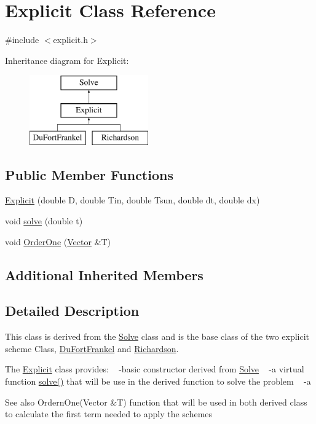 \hypertarget{class_explicit}{}\section{Explicit Class Reference}
\label{class_explicit}


{\ttfamily \#include $<$explicit.\+h$>$}

Inheritance diagram for Explicit\+:\begin{figure}[H]
\begin{center}
\leavevmode
\includegraphics[height=3.000000cm]{class_explicit}
\end{center}
\end{figure}
\subsection*{Public Member Functions}
\begin{DoxyCompactItemize}
\item 
\hyperlink{class_explicit_ab5b890fae2ea8a91c95e9a15f552f36a}{Explicit} (double D, double Tin, double Tsun, double dt, double dx)
\item 
void \hyperlink{class_explicit_ac99aa17bfd95f66b33e5c0ecf0e53785}{solve} (double t)
\item 
void \hyperlink{class_explicit_a6069720017eb2bb0d989b2557c162c97}{Order\+One} (\hyperlink{class_vector}{Vector} \&T)
\end{DoxyCompactItemize}
\subsection*{Additional Inherited Members}


\subsection{Detailed Description}
This class is derived from the \hyperlink{class_solve}{Solve} class and is the base class of the two explicit scheme Class, \hyperlink{class_du_fort_frankel}{Du\+Fort\+Frankel} and \hyperlink{class_richardson}{Richardson}.

The \hyperlink{class_explicit}{Explicit} class provides\+: ~\newline
-\/basic constructor derived from \hyperlink{class_solve}{Solve} ~\newline
-\/a virtual function \hyperlink{class_explicit_ac99aa17bfd95f66b33e5c0ecf0e53785}{solve()} that will be use in the derived function to solve the problem ~\newline
-\/a \begin{DoxySeeAlso}{See also}
Ordern\+One(\+Vector \&\+T) function that will be used in both derived class to calculate the first term needed to apply the schemes 
\end{DoxySeeAlso}


